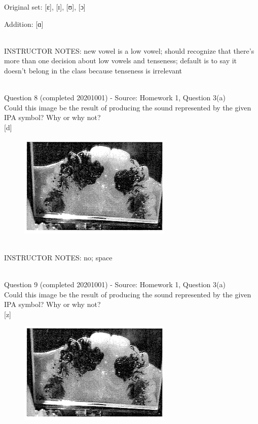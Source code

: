 \documentclass[12pt]{article}
\begin{document}
Original set: {[ɛ]}, {[ɪ]}, {[ʊ]}, {[ɔ]}

Addition: {[ɑ]}


~\\
INSTRUCTOR NOTES: new vowel is a low vowel; should recognize that there's more than one decision about low vowels and tenseness; default is to say it doesn't belong in the class because tenseness is irrelevant


~\\

{\large Question 8} (completed 20201001) - Source: Homework 1, Question 3(a)\\

Could this image be the result of producing the sound represented by the given IPA symbol? Why or why not?\\

{[d]}

\begin{figure}[H]
\includegraphics{../images/staticpalatography_fricative.png}
\end{figure}

~\\
INSTRUCTOR NOTES: no; space


~\\

{\large Question 9} (completed 20201001) - Source: Homework 1, Question 3(a)\\

Could this image be the result of producing the sound represented by the given IPA symbol? Why or why not?\\

{[z]}

\begin{figure}[H]
\includegraphics{../images/staticpalatography_fricative.png}
\end{figure}
\end{document}
